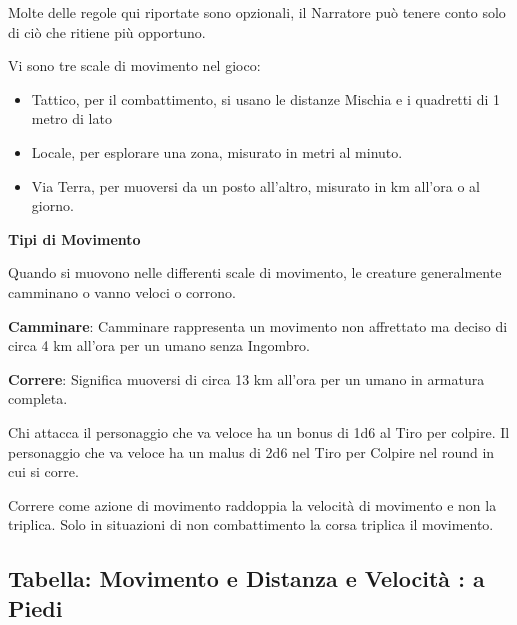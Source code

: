 \documentclass[a4paper,11pt,twoside,openany]{book}
\begin{document}
Molte delle regole qui riportate sono opzionali, il Narratore può tenere conto solo di ciò che ritiene più opportuno.

Vi sono tre scale di movimento nel gioco:
\begin{itemize}
	\item Tattico, per il combattimento, si usano le distanze Mischia e i quadretti
	      di 1 metro di lato
	\item Locale, per esplorare una zona, misurato in metri al minuto.
	\item Via Terra, per muoversi da un posto all'altro, misurato in km all'ora o al giorno.
\end{itemize}
\textbf{Tipi di Movimento}

Quando si muovono nelle differenti scale di movimento, le creature generalmente camminano o vanno veloci o corrono.

\textbf{Camminare}: Camminare rappresenta un movimento non affrettato ma deciso di circa 4 km all'ora per un umano senza Ingombro.

\textbf{Correre}: Significa muoversi di circa 13 km all'ora per un
umano in armatura completa.

Chi attacca il personaggio che va veloce ha un bonus di 1d6 al Tiro per colpire. Il personaggio che va veloce ha un malus di 2d6 nel Tiro per Colpire nel round in cui si corre.

Correre come azione di movimento raddoppia la velocità di movimento e non la triplica. Solo in situazioni di non combattimento la corsa triplica il movimento.

\subsection{Tabella: Movimento e Distanza e Velocità : a Piedi}

\medskip
\end{document}
